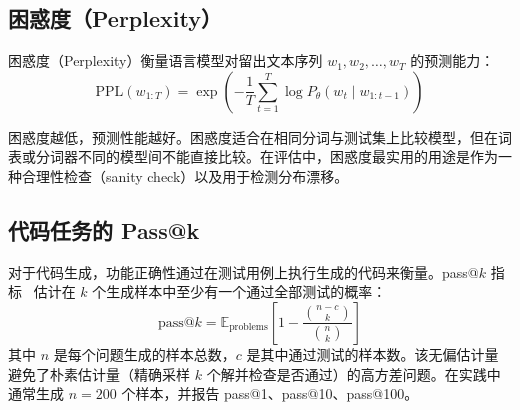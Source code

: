 \subsection{困惑度（Perplexity）}
\label{perplexity}

困惑度（Perplexity）衡量语言模型对留出文本序列 $w_1, w_2, \ldots, w_T$ 的预测能力：
\begin{equation}
    \text{PPL}(w_{1:T}) = \exp\!\left(-\frac{1}{T}\sum_{t=1}^{T} \log P_\theta(w_t \mid w_{1:t-1})\right)
\end{equation}

困惑度越低，预测性能越好。困惑度适合在相同分词与测试集上比较模型，但在词表或分词器不同的模型间不能直接比较。在评估中，困惑度最实用的用途是作为一种合理性检查（sanity check）以及用于检测分布漂移。

\subsection{代码任务的 Pass@k}
\label{passk-for-code}

对于代码生成，功能正确性通过在测试用例上执行生成的代码来衡量。pass@$k$ 指标~\cite{chen2021evaluating} 估计在 $k$ 个生成样本中至少有一个通过全部测试的概率：
\begin{equation}
    \text{pass@}k = \mathbb{E}_{\text{problems}}\!\left[1 - \frac{\binom{n-c}{k}}{\binom{n}{k}}\right]
\end{equation}
其中 $n$ 是每个问题生成的样本总数，$c$ 是其中通过测试的样本数。该无偏估计量避免了朴素估计量（精确采样 $k$ 个解并检查是否通过）的高方差问题。在实践中通常生成 $n = 200$ 个样本，并报告 pass@1、pass@10、pass@100。

